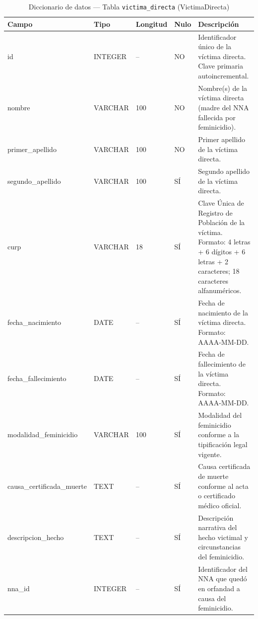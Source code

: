 \begin{table}[H]
	\centering
	\caption{Diccionario de datos --- Tabla \texttt{victima\_directa} (VictimaDirecta)}
	\label{tab:data-dict-victima_directa}
	\scriptsize
	\begin{tabular}{>{\ttfamily\raggedright\arraybackslash}p{3.6cm} p{1.6cm} p{1.3cm} p{0.7cm} p{5.6cm}}
		\toprule
		\textbf{Campo} & \textbf{Tipo} & \textbf{Longitud} & \textbf{Nulo} & \textbf{Descripción} \\
		\midrule
		id & INTEGER & -- & NO & Identificador único de la víctima directa. Clave primaria autoincremental. \\
		nombre & VARCHAR & 100 & NO & Nombre(s) de la víctima directa (madre del NNA fallecida por feminicidio). \\
		primer\_apellido & VARCHAR & 100 & NO & Primer apellido de la víctima directa. \\
		segundo\_apellido & VARCHAR & 100 & SÍ & Segundo apellido de la víctima directa. \\
		curp & VARCHAR & 18 & SÍ & Clave Única de Registro de Población de la víctima. Formato: 4 letras + 6 dígitos + 6 letras + 2 caracteres; 18 caracteres alfanuméricos. \\
		fecha\_nacimiento & DATE & -- & SÍ & Fecha de nacimiento de la víctima directa. Formato: AAAA-MM-DD. \\
		fecha\_fallecimiento & DATE & -- & SÍ & Fecha de fallecimiento de la víctima directa. Formato: AAAA-MM-DD. \\
		modalidad\_feminicidio & VARCHAR & 100 & SÍ & Modalidad del feminicidio conforme a la tipificación legal vigente. \\
		causa\_certificada\_muerte & TEXT & -- & SÍ & Causa certificada de muerte conforme al acta o certificado médico oficial. \\
		descripcion\_hecho & TEXT & -- & SÍ & Descripción narrativa del hecho victimal y circunstancias del feminicidio. \\
		nna\_id & INTEGER & -- & SÍ & Identificador del NNA que quedó en orfandad a causa del feminicidio. \\
		\bottomrule
	\end{tabular}
\end{table}

